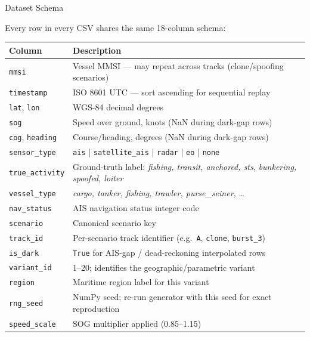 \documentclass[aspectratio=169,11pt]{beamer}
\begin{document}
\begin{frame}{Dataset Schema}

  Every row in every CSV shares the same 18-column schema:

  \medskip
  \small
  \begin{tabularx}{\textwidth}{@{}lX@{}}
    \toprule
    \textbf{Column} & \textbf{Description} \\
    \midrule
    \texttt{mmsi} & Vessel MMSI — may repeat across tracks (clone/spoofing scenarios) \\
    \texttt{timestamp} & ISO 8601 UTC — sort ascending for sequential replay \\
    \texttt{lat}, \texttt{lon} & WGS-84 decimal degrees \\
    \texttt{sog} & Speed over ground, knots (NaN during dark-gap rows) \\
    \texttt{cog}, \texttt{heading} & Course/heading, degrees (NaN during dark-gap rows) \\
    \texttt{sensor\_type} & \texttt{ais} | \texttt{satellite\_ais} | \texttt{radar} | \texttt{eo} | \texttt{none} \\
    \texttt{true\_activity} & Ground-truth label: \textit{fishing, transit, anchored, sts,}
                               \textit{bunkering, spoofed, loiter} \\
    \texttt{vessel\_type} & \textit{cargo, tanker, fishing, trawler, purse\_seiner,} \ldots \\
    \texttt{nav\_status} & AIS navigation status integer code \\
    \texttt{scenario} & Canonical scenario key \\
    \texttt{track\_id} & Per-scenario track identifier (e.g.\ \texttt{A}, \texttt{clone}, \texttt{burst\_3}) \\
    \texttt{is\_dark} & \texttt{True} for AIS-gap / dead-reckoning interpolated rows \\
    \texttt{variant\_id} & 1–20; identifies the geographic/parametric variant \\
    \texttt{region} & Maritime region label for this variant \\
    \texttt{rng\_seed} & NumPy seed; re-run generator with this seed for exact reproduction \\
    \texttt{speed\_scale} & SOG multiplier applied (0.85–1.15) \\
    \bottomrule
  \end{tabularx}
\end{frame}
\end{document}
